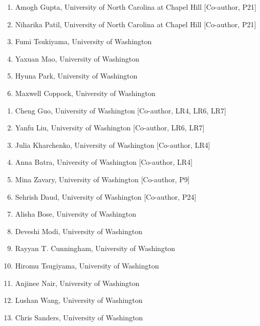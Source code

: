 \documentclass[10pt, letterpaper]{article}
\begin{document}
\noindent{}\vspace{3pt}
\begin{enumerate}
    \item[] Amogh Gupta, University of North Carolina at Chapel Hill [Co-author, P21]
    \item[] Niharika Patil, University of North Carolina at Chapel Hill [Co-author, P21]
    \item[] Fumi Tsukiyama, University of Washington 
    \item[] Yaxuan Mao, University of Washington 
    \item[] Hyuna Park, University of Washington  
    \item[] Maxwell Coppock, University of Washington  
\end{enumerate}
\vspace{5pt}


\noindent{}\vspace{3pt}
\begin{enumerate}
    \item[] Cheng Guo, University of Washington [Co-author, LR4, LR6, LR7]
    \item[] Yanfu Liu, University of Washington [Co-author, LR6, LR7] 
    \item[] Julia Kharchenko, University of Washington [Co-author, LR4] 
    \item[] Anna Batra, University of Washington [Co-author, LR4] 
    \item[] Mina Zavary, University of Washington [Co-author, P9] 
    \item[] Sehrish Daud, University of Washington [Co-author, P24]
    \item[] Alisha Bose, University of Washington
    \item[] Deveshi Modi, University of Washington
    \item[] Rayyan T. Cunningham, University of Washington
    \item[] Hiromu Tsugiyama, University of Washington 
    \item[] Anjinee Nair, University of Washington 
    \item[] Lushan Wang, University of Washington 
    \item[] Chris Sanders, University of Washington  
        
\end{enumerate}
\end{document}
